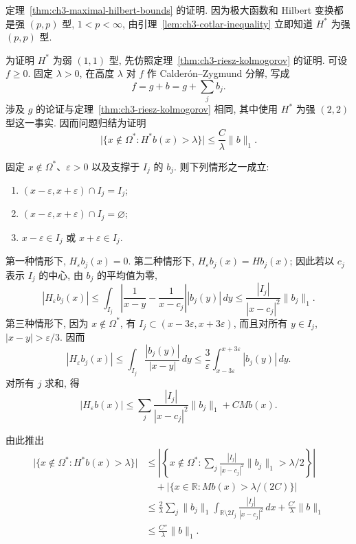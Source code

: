 \begin{Proof}
定理~\ref{thm:ch3-maximal-hilbert-bounds} 的证明.
因为极大函数和 Hilbert 变换都是强 $(p,p)$ 型, $1<p<\infty$, 由引理~\ref{lem:ch3-cotlar-inequality} 立即知道 $H^*$ 为强 $(p,p)$ 型.

为证明 $H^*$ 为弱 $(1,1)$ 型, 先仿照定理~\ref{thm:ch3-riesz-kolmogorov} 的证明. 可设 $f\ge0$. 固定 $\lambda>0$, 在高度 $\lambda$ 对 $f$ 作 Calderón--Zygmund 分解, 写成
\[
 f=g+b=g+\sum_jb_j.
\]
涉及 $g$ 的论证与定理~\ref{thm:ch3-riesz-kolmogorov} 相同, 其中使用 $H^*$ 为强 $(2,2)$ 型这一事实. 因而问题归结为证明
\[
 \bigl|\{x\notin\Omega^*:H^*b(x)>\lambda\}\bigr|
 \le\frac C\lambda\|b\|_1.
\]

固定 $x\notin\Omega^*$、$\varepsilon>0$ 以及支撑于 $I_j$ 的 $b_j$. 则下列情形之一成立:
\begin{enumerate}
\item $(x-\varepsilon,x+\varepsilon)\cap I_j=I_j$;
\item $(x-\varepsilon,x+\varepsilon)\cap I_j=\varnothing$;
\item $x-\varepsilon\in I_j$ 或 $x+\varepsilon\in I_j$.
\end{enumerate}
第一种情形下, $H_\varepsilon b_j(x)=0$. 第二种情形下, $H_\varepsilon b_j(x)=Hb_j(x)$; 因此若以 $c_j$ 表示 $I_j$ 的中心, 由 $b_j$ 的平均值为零,
\[
 |H_\varepsilon b_j(x)|
 \le\int_{I_j}\left|\frac1{x-y}-\frac1{x-c_j}\right||b_j(y)|\,dy
 \le\frac{|I_j|}{|x-c_j|^2}\|b_j\|_1.
\]
第三种情形下, 因为 $x\notin\Omega^*$, 有 $I_j\subset(x-3\varepsilon,x+3\varepsilon)$, 而且对所有 $y\in I_j$, $|x-y|>\varepsilon/3$. 因而
\[
 |H_\varepsilon b_j(x)|
 \le\int_{I_j}\frac{|b_j(y)|}{|x-y|}\,dy
 \le\frac3\varepsilon\int_{x-3\varepsilon}^{x+3\varepsilon}|b_j(y)|\,dy.
\]
对所有 $j$ 求和, 得
\[
 |H_\varepsilon b(x)|
 \le\sum_j\frac{|I_j|}{|x-c_j|^2}\|b_j\|_1+CMb(x).
\]

\hypertarget{chapter-03-page-070}{}
由此推出
\[
\begin{aligned}
 \bigl|\{x\notin\Omega^*:H^*b(x)>\lambda\}\bigr|
 &\le\left|\left\{x\notin\Omega^*:
 \sum_j\frac{|I_j|}{|x-c_j|^2}\|b_j\|_1>\lambda/2\right\}\right|\\
 &\quad+\bigl|\{x\in\mathbb R:Mb(x)>\lambda/(2C)\}\bigr|\\
 &\le\frac2\lambda\sum_j\|b_j\|_1
 \int_{\mathbb R\setminus2I_j}\frac{|I_j|}{|x-c_j|^2}\,dx
 +\frac{C'}\lambda\|b\|_1\\
 &\le\frac{C''}\lambda\|b\|_1.
\end{aligned}
\]
\end{Proof}
